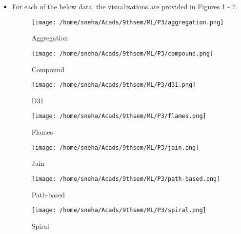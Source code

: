 \documentclass[12pt]{article}
\begin{document}
\begin{itemize}
\item{For each of the below data, the visualizations are provided in Figures 1 - 7.


\begin{figure}
	\centering
		\texttt{[image: /home/sneha/Acads/9thsem/ML/P3/aggregation.png]}
	\caption{Aggregation}
	
\end{figure}


\begin{figure}
	\centering
		\texttt{[image: /home/sneha/Acads/9thsem/ML/P3/compound.png]}
	\caption{Compound}
	
\end{figure}




\begin{figure}
	\centering
		\texttt{[image: /home/sneha/Acads/9thsem/ML/P3/d31.png]}
	\caption{D31}
	
\end{figure}


\begin{figure}
	\centering
		\texttt{[image: /home/sneha/Acads/9thsem/ML/P3/flames.png]}
	\caption{Flames}
	
\end{figure}


\begin{figure}
	\centering
		\texttt{[image: /home/sneha/Acads/9thsem/ML/P3/jain.png]}
	\caption{Jain}
	
\end{figure}




\begin{figure}
	\centering
		\texttt{[image: /home/sneha/Acads/9thsem/ML/P3/path-based.png]}
	\caption{Path-based}
	
\end{figure}



\begin{figure}
	\centering
		\texttt{[image: /home/sneha/Acads/9thsem/ML/P3/spiral.png]}
	\caption{Spiral}
	
\end{figure}







}


\end{itemize}
\end{document}
